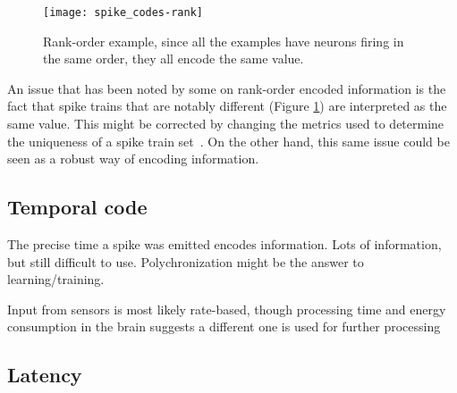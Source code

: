 \begin{figure}[hbt]
  \begin{center}
    \texttt{[image: spike\_codes-rank]}
    \caption{Rank-order example, since all the examples have neurons firing in the same order, they all encode the same value.}
    \label{fig:neuro:spike-rank-order}
  \end{center}
\end{figure}

An issue that has been noted by some on rank-order encoded information is the fact that spike trains that are notably different (Figure \ref{fig:neuro:spike-rank-order}) are interpreted as the same value. This might be corrected by changing the metrics used to determine the uniqueness of a spike train set~\cite{Cessac2010}. On the other hand, this same issue could be seen as a robust way of encoding information.

\subsection{Temporal code}
The precise time a spike was emitted encodes information. Lots of information, but still difficult to use. Polychronization might be the answer to learning/training.



Input from sensors is most likely rate-based, though processing time and energy consumption in the brain suggests a different one is used for further processing

\subsection{Latency}